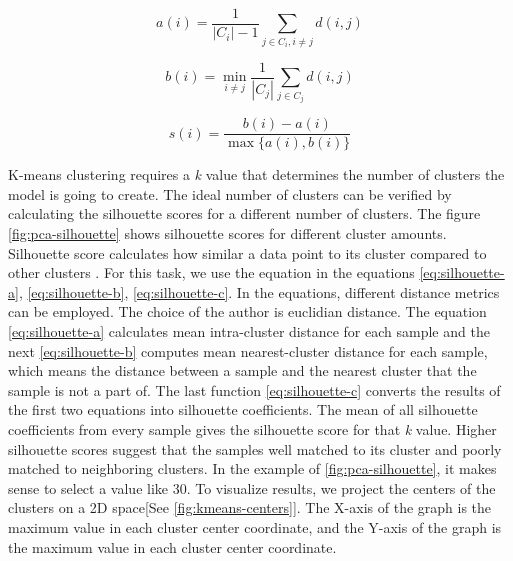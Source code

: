 \begin{equation}
a(i)=\frac{1}{\left|C_{i}\right|-1} \sum_{j \in C_{i}, i \neq j} d(i, j)
\label{eq:silhouette-a}
\end{equation}

\begin{equation}
b(i)=\min _{i \neq j} \frac{1}{\left|C_{j}\right|} \sum_{j \in C_{j}} d(i, j)
\label{eq:silhouette-b}
\end{equation}

\begin{equation}
s(i)=\frac{b(i)-a(i)}{\max \{a(i), b(i)\}}
\label{eq:silhouette-c}
\end{equation}

K-means clustering requires a \textit{k} value that determines the number of clusters the model is going to create. The ideal number of clusters can be verified by calculating the silhouette scores for a different number of clusters. The figure \ref{fig:pca-silhouette} shows silhouette scores for different cluster amounts. Silhouette score calculates how similar a data point to its cluster compared to other clusters \parencite{rousseeuw1987silhouettes}. For this task, we use the equation in the equations \ref{eq:silhouette-a}, \ref{eq:silhouette-b}, \ref{eq:silhouette-c}. In the equations, different distance metrics can be employed. The choice of the author is euclidian distance.  The equation \ref{eq:silhouette-a} calculates mean intra-cluster distance for each sample and the next \ref{eq:silhouette-b} computes mean nearest-cluster distance for each sample, which means the distance between a sample and the nearest cluster that the sample is not a part of. The last function \ref{eq:silhouette-c} converts the results of the first two equations into silhouette coefficients. The mean of all silhouette coefficients from every sample gives the silhouette score for that \textit{k} value. Higher silhouette scores suggest that the samples well matched to its cluster and poorly matched to neighboring clusters. In the example of \ref{fig:pca-silhouette}, it makes sense to select a value like 30. To visualize results, we project the centers of the clusters  on a 2D space[See \ref{fig:kmeans-centers}]. The X-axis of the graph is the maximum value in each cluster center coordinate, and the Y-axis of the graph is the maximum value in each cluster center coordinate.

